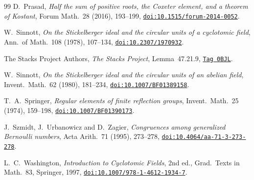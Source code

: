 \documentclass[11pt,a4paper]{article}
\theoremstyle{definition}
\begin{document}
\begin{thebibliography}{99}
 D.~Prasad, \emph{Half the sum of positive roots, the Coxeter element, and a theorem of Kostant}, Forum Math.~28 (2016), 193--199, \href{https://doi.org/10.1515/forum-2014-0052}{\texttt{doi:10.1515/forum-2014-0052}}.

 W.~Sinnott, \emph{On the Stickelberger ideal and the circular units of a cyclotomic field}, Ann.~of Math.~108 (1978), 107--134, \href{https://doi.org/10.2307/1970932}{\texttt{doi:10.2307/1970932}}.

 The Stacks Project Authors, \emph{The Stacks Project}, Lemma~47.21.9, \href{https://stacks.math.columbia.edu/tag/0BJL}{\texttt{Tag 0BJL}}.

 W.~Sinnott, \emph{On the Stickelberger ideal and the circular units of an abelian field}, Invent.~Math.~62 (1980), 181--234, \href{https://doi.org/10.1007/BF01389158}{\texttt{doi:10.1007/BF01389158}}.

 T.~A.~Springer, \emph{Regular elements of finite reflection groups}, Invent.~Math.~25 (1974),
159--198, \href{https://doi.org/10.1007/BF01390173}{\texttt{doi:10.1007/BF01390173}}.

 J.~Szmidt, J.~Urbanowicz and D.~Zagier, \emph{Congruences among generalized Bernoulli numbers}, Acta Arith.~71 (1995), 273--278, \href{https://doi.org/10.4064/aa-71-3-273-278}{\texttt{doi:10.4064/aa-71-3-273-278}}.

 L.~C.~Washington, \emph{Introduction to Cyclotomic Fields}, 2nd ed., Grad.~Texts in Math.~83, Springer, 1997, \href{https://doi.org/10.1007/978-1-4612-1934-7}{\texttt{doi:10.1007/978-1-4612-1934-7}}.

\end{thebibliography}
\end{document}
